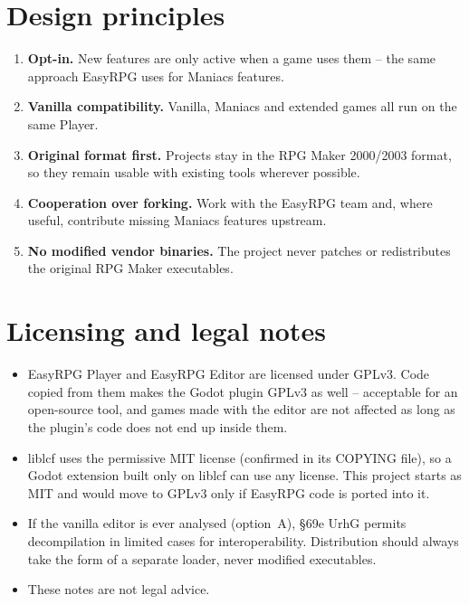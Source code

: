 \documentclass[11pt,a4paper]{article}
\begin{document}
\section{Design principles}

\begin{enumerate}
  \item \textbf{Opt-in.} New features are only active when a game uses them -- the same
        approach EasyRPG uses for Maniacs features.
  \item \textbf{Vanilla compatibility.} Vanilla, Maniacs and extended games all run on
        the same Player.
  \item \textbf{Original format first.} Projects stay in the RPG Maker 2000/2003 format,
        so they remain usable with existing tools wherever possible.
  \item \textbf{Cooperation over forking.} Work with the EasyRPG team and, where useful,
        contribute missing Maniacs features upstream.
  \item \textbf{No modified vendor binaries.} The project never patches or redistributes
        the original RPG Maker executables.
\end{enumerate}

\section{Licensing and legal notes}

\begin{itemize}
  \item EasyRPG Player and EasyRPG Editor are licensed under GPLv3. Code copied from
        them makes the Godot plugin GPLv3 as well -- acceptable for an open-source
        tool, and games made with the editor are not affected as long as the plugin's
        code does not end up inside them.
  \item liblcf uses the permissive MIT license (confirmed in its COPYING file), so a
        Godot extension built only on liblcf can use any license. This project starts
        as MIT and would move to GPLv3 only if EasyRPG code is ported into it.
  \item If the vanilla editor is ever analysed (option~A), §69e UrhG permits
        decompilation in limited cases for interoperability. Distribution should always
        take the form of a separate loader, never modified executables.
  \item These notes are not legal advice.
\end{itemize}
\end{document}
